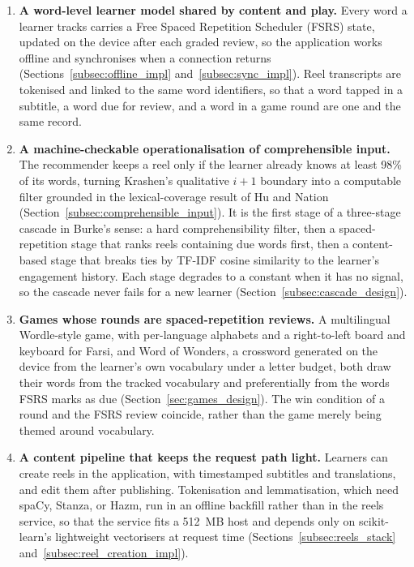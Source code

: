     \begin{enumerate}
        \item \textbf{A word-level learner model shared by content and play.} Every word a learner tracks carries a Free Spaced Repetition Scheduler (FSRS) state, updated on the device after each graded review, so the application works offline and synchronises when a connection returns (Sections~\ref{subsec:offline_impl} and~\ref{subsec:sync_impl}). Reel transcripts are tokenised and linked to the same word identifiers, so that a word tapped in a subtitle, a word due for review, and a word in a game round are one and the same record.
        \item \textbf{A machine-checkable operationalisation of comprehensible input.} The recommender keeps a reel only if the learner already knows at least 98\% of its words, turning Krashen's qualitative $i+1$ boundary into a computable filter grounded in the lexical-coverage result of Hu and Nation (Section~\ref{subsec:comprehensible_input}). It is the first stage of a three-stage cascade in Burke's sense: a hard comprehensibility filter, then a spaced-repetition stage that ranks reels containing due words first, then a content-based stage that breaks ties by TF-IDF cosine similarity to the learner's engagement history. Each stage degrades to a constant when it has no signal, so the cascade never fails for a new learner (Section~\ref{subsec:cascade_design}).
        \item \textbf{Games whose rounds are spaced-repetition reviews.} A multilingual Wordle-style game, with per-language alphabets and a right-to-left board and keyboard for Farsi, and Word of Wonders, a crossword generated on the device from the learner's own vocabulary under a letter budget, both draw their words from the tracked vocabulary and preferentially from the words FSRS marks as due (Section~\ref{sec:games_design}). The win condition of a round and the FSRS review coincide, rather than the game merely being themed around vocabulary.
        \item \textbf{A content pipeline that keeps the request path light.} Learners can create reels in the application, with timestamped subtitles and translations, and edit them after publishing. Tokenisation and lemmatisation, which need spaCy, Stanza, or Hazm, run in an offline backfill rather than in the reels service, so that the service fits a 512~MB host and depends only on scikit-learn's lightweight vectorisers at request time (Sections~\ref{subsec:reels_stack} and~\ref{subsec:reel_creation_impl}).

\end{enumerate}
